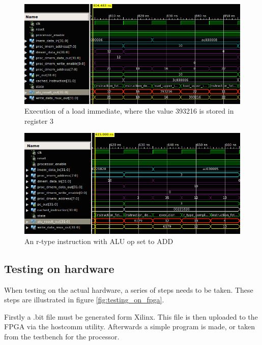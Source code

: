 \begin{figure}[ht!]
    \begin{center}
    \includegraphics[width=\textwidth]{assets/isim/load_upper_cycle.png}
    \caption{Execution of a load immediate, where the value 393216 is stored in register 3}
    \label{fig:load_upper_cycle}
    \end{center}
\end{figure}

\begin{figure}[ht!]
    \begin{center}
    \includegraphics[width=\textwidth]{assets/isim/r_type_cycle.png}
    \caption{An r-type instruction with ALU op set to ADD}
    \label{fig:r_type_cycle}
    \end{center}
\end{figure}

\subsection{Testing on hardware}

When testing on the actual hardware, a series of steps needs to be taken.
These steps are illustrated in figure \ref{fig:testing_on_fpga}.

Firstly a .bit file must be generated form Xilinx.
This file is then uploaded to the FPGA via the hostcomm utility.
Afterwards a simple program is made, or taken from the testbench for the processor.

